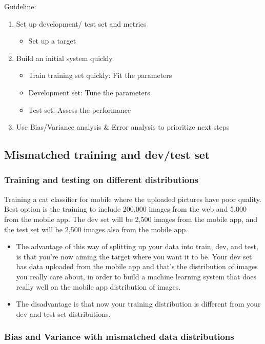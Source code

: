 Guideline:
\begin{enumerate}
    \item Set up development/ test set and metrics
    \begin{itemize}
        \item Set up a target 
    \end{itemize}
    \item Build an initial system quickly
    \begin{itemize}
        \item Train training set quickly: Fit the parameters
        \item Development set: Tune the parameters
        \item Test set: Assess the performance
    \end{itemize}
    \item Use Bias/Variance analysis \& Error analysis to prioritize next steps
\end{enumerate}

\subsection{Mismatched training and dev/test set}
\subsubsection{Training and testing on different distributions}
Training a cat classifier for mobile where the uploaded pictures have poor quality. Best option is the training to include 200,000 images from the web and 5,000 from the mobile app. The dev set will be 2,500 images from the mobile app, and the test set will be 2,500 images also from the mobile app. 
\begin{itemize}
    \item The advantage of this way of splitting up your data into train, dev, and test, is that you're now aiming the target where you want it to be. Your dev set has data uploaded from the mobile app and that's the distribution of images you really care about, in order to build a machine learning system that does really well on the mobile app distribution of images.
    \item The disadvantage is that now your training distribution is different from your dev and test set distributions. 
\end{itemize}

\subsubsection{Bias and Variance with mismatched data distributions}

